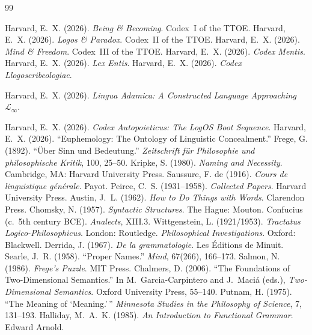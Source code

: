 \documentclass[11pt, oneside]{article}
\theoremstyle{definition}
\begin{document}
\begin{thebibliography}{99}

 Harvard, E.~X. (2026). \textit{Being \& Becoming}. Codex~I of the TTOE.
 Harvard, E.~X. (2026). \textit{Logos \& Paradox}. Codex~II of the TTOE.
 Harvard, E.~X. (2026). \textit{Mind \& Freedom}. Codex~III of the TTOE.
 Harvard, E.~X. (2026). \textit{Codex Mentis}.
 Harvard, E.~X. (2026). \textit{Lex Entis}.
 Harvard, E.~X. (2026). \textit{Codex Llogoscribeologiae}.

 Harvard, E.~X. (2026). \textit{Lingua Adamica: A Constructed Language Approaching $\mathcal{L}_\infty$}.

 Harvard, E.~X. (2026). \textit{Codex Autopoieticus: The LogOS Boot Sequence}.
 Harvard, E.~X. (2026). ``Euphemology: The Ontology of Linguistic Concealment.''
 Frege, G. (1892). ``\"{U}ber Sinn und Bedeutung.'' \textit{Zeitschrift f\"{u}r Philosophie und philosophische Kritik}, 100, 25--50.
 Kripke, S. (1980). \textit{Naming and Necessity}. Cambridge, MA: Harvard University Press.
 Saussure, F. de (1916). \textit{Cours de linguistique g\'{e}n\'{e}rale}. Payot.
 Peirce, C.~S. (1931--1958). \textit{Collected Papers}. Harvard University Press.
 Austin, J.~L. (1962). \textit{How to Do Things with Words}. Clarendon Press.
 Chomsky, N. (1957). \textit{Syntactic Structures}. The Hague: Mouton.
 Confucius (c.~5th century BCE). \textit{Analects}, XIII.3.
 Wittgenstein, L. (1921/1953). \textit{Tractatus Logico-Philosophicus}. London: Routledge. \textit{Philosophical Investigations}. Oxford: Blackwell.
 Derrida, J. (1967). \textit{De la grammatologie}. Les \'{E}ditions de Minuit.
 Searle, J.~R. (1958). ``Proper Names.'' \textit{Mind}, 67(266), 166--173.
 Salmon, N. (1986). \textit{Frege's Puzzle}. MIT Press.
 Chalmers, D. (2006). ``The Foundations of Two-Dimensional Semantics.'' In M.~Garcia-Carpintero and J.~Maci\'{a} (eds.), \textit{Two-Dimensional Semantics}. Oxford University Press, 55--140.
 Putnam, H. (1975). ``The Meaning of `Meaning.'\,'' \textit{Minnesota Studies in the Philosophy of Science}, 7, 131--193.
 Halliday, M.~A.~K. (1985). \textit{An Introduction to Functional Grammar}. Edward Arnold.


\end{thebibliography}
\end{document}
